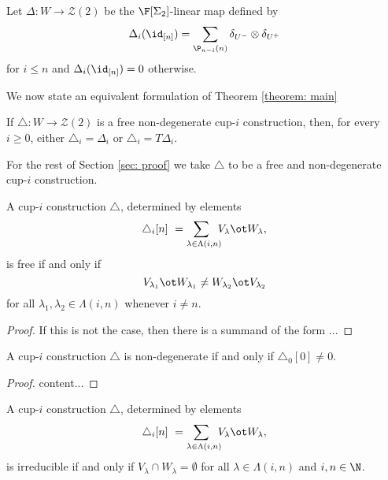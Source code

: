 \begin{definition}
	Let $\Delta \colon W \to \mathcal Z(2)$ be the $\F[\Sigma_2]$-linear map defined by
	\[
	\Delta_i(\id_{[n]}) = \sum_{\P_{n-i}(n)} \delta_{U^{-}} \otimes \delta_{U^{+}}
	\]
	for $i \leq n$ and $\Delta_i(\id_{[n]}) = 0$ otherwise.
\end{definition}

We now state an equivalent formulation of Theorem \ref{theorem: main}

\begin{theorem} \label{theorem: main reformulated}
	If $\triangle : W \to \mathcal{Z}(2)$ is a free non-degenerate cup-$i$ construction, then, for every $i \geq 0$, either $\triangle_i = \Delta_i$ or $\triangle_i = T \Delta_i$.
\end{theorem}

For the rest of Section \ref{sec: proof} we take $\triangle$ to be a free and non-degenerate cup-$i$ construction.



\begin{lemma} \label{l:freeness recasted}
	A cup-$i$ construction $\triangle$, determined by elements
	\[
	\triangle_i [n] \ =
	\sum_{\lambda \in \Lambda(i,n) \kern-5pt} V_\lambda \ot W_\lambda,
	\]
	is free if and only if
	\[
	V_{\lambda_1} \ot W_{\lambda_1} \neq
	W_{\lambda_2} \ot V_{\lambda_2}
	\]
	for all $\lambda_1, \lambda_2 \in \Lambda(i,n)$ whenever $i \neq n$.
\end{lemma}

\begin{proof}
	If this is not the case, then there is a summand of the form ...
\end{proof}

\begin{lemma} \label{l:non-degeneracy recasted}
	A cup-$i$ construction $\triangle$ is non-degenerate if and only if $\triangle_0 [0] \neq 0$.
\end{lemma}

\begin{proof}
	content...
\end{proof}

\begin{lemma} \label{l:irreducibility recasted}
	A cup-$i$ construction $\triangle$, determined by elements
	\[
	\triangle_i [n] \ =
	\sum_{\lambda \in \Lambda(i,n) \kern-5pt} V_\lambda \ot W_\lambda,
	\]
	is irreducible if and only if $V_\lambda \cap W_\lambda = \emptyset$ for all $\lambda \in \Lambda(i,n)$ and $i, n \in \N$.
\end{lemma}

